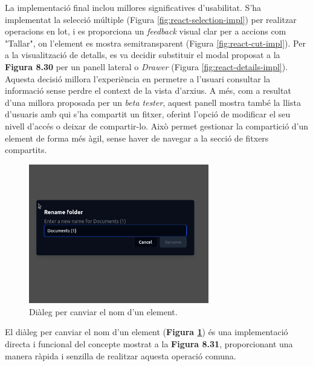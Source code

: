 La implementació final inclou millores significatives d'usabilitat. S'ha implementat la selecció múltiple (Figura \ref{fig:react-selection-impl}) per realitzar operacions en lot, i es proporciona un \textit{feedback} visual clar per a accions com "Tallar", on l'element es mostra semitransparent (Figura \ref{fig:react-cut-impl}). Per a la visualització de detalls, es va decidir substituir el modal proposat a la \textbf{Figura 8.30} per un panell lateral o \textit{Drawer} (Figura \ref{fig:react-details-impl}). Aquesta decisió millora l'experiència en permetre a l'usuari consultar la informació sense perdre el context de la vista d'arxius. A més, com a resultat d'una millora proposada per un \textit{beta tester}, aquest panell mostra també la llista d'usuaris amb qui s'ha compartit un fitxer, oferint l'opció de modificar el seu nivell d'accés o deixar de compartir-lo. Això permet gestionar la compartició d'un element de forma més àgil, sense haver de navegar a la secció de fitxers compartits.

\begin{figure}[H]
    \centering
    \includegraphics[width=0.7\textwidth]{Figures/ui-web/rename_dialog.png}
    \caption{Diàleg per canviar el nom d'un element.}
    \label{fig:react-rename-impl}
\end{figure}

El diàleg per canviar el nom d'un element (\textbf{Figura \ref{fig:react-rename-impl}}) és una implementació directa i funcional del concepte mostrat a la \textbf{Figura 8.31}, proporcionant una manera ràpida i senzilla de realitzar aquesta operació comuna.

